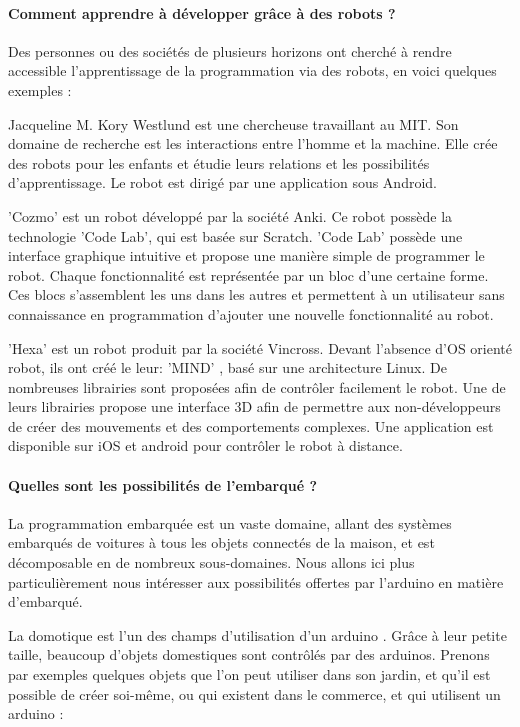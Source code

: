 \documentclass[12pt,francais]{report}
\begin{document}
\paragraph*{Comment apprendre à développer grâce à des robots ?\\}

Des personnes ou des sociétés de plusieurs horizons ont cherché à rendre accessible l'apprentissage de la programmation via des robots, en voici quelques exemples :

Jacqueline M. Kory Westlund est une chercheuse travaillant au MIT. Son domaine de recherche est les interactions entre l'homme et la machine.
Elle crée des robots pour les enfants et étudie leurs relations et les possibilités d'apprentissage.\cite{ref9}
Le robot est dirigé par une application sous Android.

'Cozmo' est un robot développé par la société Anki. Ce robot possède la technologie 'Code Lab', qui est basée sur Scratch.\cite{ref10} 
'Code Lab' possède une interface graphique intuitive et propose une manière simple de programmer le robot.
Chaque fonctionnalité est représentée par un bloc d'une certaine forme.
Ces blocs s'assemblent les uns dans les autres et permettent à un utilisateur sans connaissance en programmation d'ajouter une nouvelle fonctionnalité au robot.

'Hexa' est un robot produit par la société Vincross. Devant l'absence d'OS orienté robot, ils ont créé le leur: 'MIND' \cite{ref11},
basé sur une architecture Linux. De nombreuses librairies sont proposées afin de contrôler facilement le robot.
Une de leurs librairies propose une interface 3D afin de permettre aux non-développeurs de créer des mouvements et des comportements complexes.
Une application est disponible sur iOS et android pour contrôler le robot à distance.

\paragraph*{Quelles sont les possibilités de l'embarqué ?\\}

La programmation embarquée est un vaste domaine, allant des systèmes embarqués de voitures à tous les objets connectés de la maison, et est décomposable en de nombreux sous-domaines. Nous allons ici plus particulièrement nous intéresser aux possibilités offertes par l'arduino en matière d'embarqué.

La domotique est l'un des champs d'utilisation d'un arduino \cite{ref20}. Grâce à leur petite taille, beaucoup d'objets domestiques sont contrôlés par des arduinos. Prenons par exemples quelques objets que l'on peut utiliser dans son jardin, et qu'il est possible de créer soi-même, ou qui existent dans le commerce, et qui utilisent un arduino \cite{ref21}: 
\end{document}
